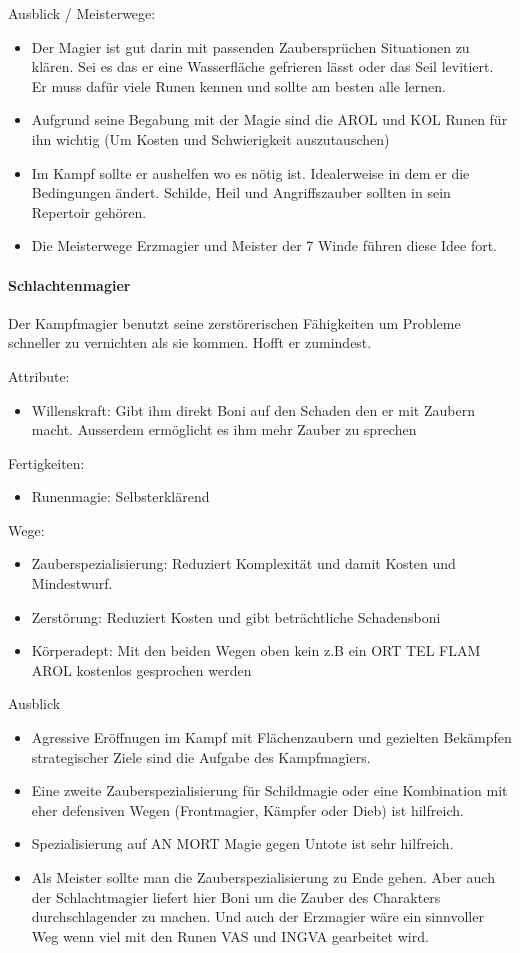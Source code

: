 \documentclass{article}
\begin{document}
Ausblick / Meisterwege:
\begin{itemize}
\item Der Magier ist gut darin mit passenden Zaubersprüchen Situationen zu klären. Sei es das er eine Wasserfläche gefrieren lässt oder das Seil levitiert. Er muss dafür viele Runen kennen und sollte am besten alle lernen.
\item Aufgrund seine Begabung mit der Magie sind die AROL und KOL Runen für ihn wichtig (Um Kosten und Schwierigkeit auszutauschen)
\item Im Kampf sollte er aushelfen wo es nötig ist. Idealerweise in dem er die Bedingungen ändert. Schilde, Heil und Angriffszauber sollten in sein Repertoir gehören.
\item Die Meisterwege Erzmagier und Meister der 7 Winde führen diese Idee fort.
\end{itemize}

\paragraph{Schlachtenmagier}
Der Kampfmagier benutzt seine zerstörerischen Fähigkeiten um Probleme schneller zu vernichten als sie kommen. Hofft er
zumindest.

Attribute:
\begin{itemize}
\item Willenskraft: Gibt ihm direkt Boni auf den Schaden den er mit Zaubern macht. Ausserdem ermöglicht es ihm mehr Zauber zu sprechen
\end{itemize}

Fertigkeiten:
\begin{itemize}
\item Runenmagie: Selbsterklärend
\end{itemize}

Wege:
\begin{itemize}
\item Zauberspezialisierung: Reduziert Komplexität und damit Kosten und Mindestwurf.
\item Zerstörung: Reduziert Kosten und gibt beträchtliche Schadensboni
\item Körperadept: Mit den beiden Wegen oben kein z.B ein ORT TEL FLAM AROL kostenlos gesprochen werden
\end{itemize}

Ausblick
\begin{itemize}
\item Agressive Eröffnugen im Kampf mit Flächenzaubern und gezielten Bekämpfen strategischer Ziele sind die Aufgabe des Kampfmagiers.
\item Eine zweite Zauberspezialisierung für Schildmagie oder eine Kombination mit eher defensiven Wegen (Frontmagier, Kämpfer oder Dieb) ist hilfreich.
\item Spezialisierung auf AN MORT Magie gegen Untote ist sehr hilfreich.
\item Als Meister sollte man die Zauberspezialisierung zu Ende gehen. Aber auch der Schlachtmagier liefert hier Boni um die Zauber des Charakters durchschlagender zu machen. Und auch der Erzmagier wäre ein sinnvoller Weg wenn viel mit den Runen VAS und INGVA gearbeitet wird.
\end{itemize}
\end{document}
